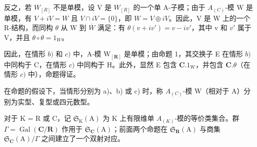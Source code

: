 反之，若 \(W_{[R]}\) 不是单模，设 V 是 \(W_{[R]}\) 的一个单 A-子模；由于 \(A_{(C)}\)-模 W 是单模，有 \(V + iV = W\) 且 \(V \cap iV = \{0\}\)，即 \(W = V \oplus iV\)。因此，V 是 W 上的一个 R-结构，而同构 \(\theta\) 从 W 到 \(\overline{W}\) 满足：有 \(\theta(v + iv') = v - iv'\)，其中 v 和 \(v'\) 属于 V，并且 \(\theta \circ \theta = 1_{W}\)。

因此，在情形 \(b)\) 和 \(c)\) 中，A-模 \(\mathrm{W}_{[\mathbf{R}]}\) 是单模；由命题 1，其交换子 E 在情形 \(b)\) 中同构于 C，在情形 \(c)\) 中同构于 H。此外，显然 E 包含 \(\mathbf{C}.1_{\mathrm{W}}\)，并包含 \(\mathbf{C}.\theta\)（在情形 \(c)\) 中），命题得证。

在命题的假设下，当情形分别为 a)、b) 或 c) 时，称 \(A_{(C)}\)-模 W（相对于 A）分别为实型、复型或四元数型。

对于 K = R 或 C，记 \(\mathfrak{S}_{\mathrm{K}}(\mathrm{A})\) 为 K 上有限维单 \(A_{(K)}\)-模的等价类集合。群 \(\Gamma = \operatorname{Gal}(\mathbf{C}/\mathbf{R})\) 作用于 \(\mathfrak{S}_{\mathbf{C}}(\mathrm{A})\)；前面两个命题在 \(\mathfrak{S}_{\mathbf{R}}(\mathrm{A})\) 与商集 \(\mathfrak{S}_{\mathbf{C}}(\mathrm{A})/\Gamma\) 之间建立了一个双射对应。